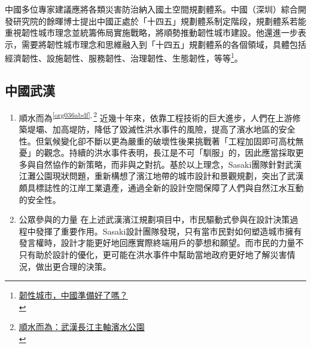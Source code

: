 \documentclass[a4paper,12pt]{article}
\begin{document}
中國多位專家建議應將各類災害防治納入國土空間規劃體系。中國（深圳）綜合開發研究院的餘暉博士提出中國正處於「十四五」規劃體系制定階段，規劃體系若能重視韌性城市理念並統籌佈局實施戰略，將順勢推動韌性城市建設。他還進一步表示，需要將韌性城市理念和思維融入到「十四五」規劃體系的各個領域，具體包括經濟韌性、設施韌性、服務韌性、治理韌性、生態韌性，等等\footnote{\href{http://chla.com.cn/htm/2020/0317/274871.html}{韌性城市，中國準備好了嗎？}\\}。\\

\subsection{中國武漢}
\label{sec:org9f05bf2}
\begin{enumerate}
\item 順水而為\textsuperscript{\ref{org036abdf}}\textsuperscript{,}\,\footnote{\href{https://a.design/index.php?m=doc\&a=doc\_show\&id=528E3CD63464219F5E1BD8}{順水而為：武漢長江主軸濱水公園}\\}
\label{sec:org5246eac}
近幾十年來，依靠工程技術的巨大進步，人們在上游修築堤壩、加高堤防，降低了毀滅性洪水事件的風險，提高了濱水地區的安全性。但氣候變化卻不斷以更為嚴重的破壞性後果挑戰著「工程加固即可高枕無憂」的觀念。持續的洪水事件表明，長江是不可「馴服」的，因此應當採取更多與自然協作的新策略，而非與之對抗。基於以上理念，Sasaki團隊針對武漢江灘公園現狀問題，重新構想了濱江地帶的城市設計和景觀規劃，突出了武漢頗具標誌性的江岸工業遺產，通過全新的設計空間保障了人們與自然江水互動的安全性。\\
\item 公眾參與的力量
\label{sec:org5512dc4}
在上述武漢濱江規劃項目中，市民驅動式參與在設計決策過程中發揮了重要作用。Sasaki設計團隊發現，只有當市民對如何塑造城市擁有發言權時，設計才能更好地回應實際終端用戶的夢想和願望。而市民的力量不只有助於設計的優化，更可能在洪水事件中幫助當地政府更好地了解災害情況，做出更合理的決策。\\
\end{enumerate}
\end{document}
